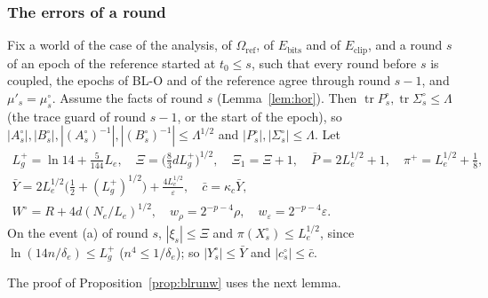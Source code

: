 \documentclass[11pt]{amsart}
\theoremstyle{definition}
\numberwithin{equation}{section}
\newcommand{\tr}{\operatorname{tr}}
\begin{document}
\subsubsection{The errors of a round}\label{app:track-errors}

Fix a world of the case of the analysis, of $\Omega_{\mathrm{ref}}$, of $E_{\mathrm{bits}}$ and of $E_{\mathrm{clip}}$, and a round $s$ of an epoch of the reference started at $t_0\le s$, such that every round before $s$ is coupled, the epochs of BL-O and of the reference agree through round $s-1$, and $\mu'_s=\mu^\circ_s$. Assume the facts of round $s$ (Lemma~\ref{lem:hor}). Then $\tr P^\circ_s,\tr\Sigma^\circ_s\le\Lambda$ (the trace guard of round $s-1$, or the start of the epoch), so $|A^\circ_s|,|B^\circ_s|,|(A^\circ_s)^{-1}|,|(B^\circ_s)^{-1}|\le\Lambda^{1/2}$ and $|P^\circ_s|,|\Sigma^\circ_s|\le\Lambda$. Let
\begin{gather*}
L_g^+=\ln14+\tfrac5{144}L_e,\quad\Xi=\bigl(\tfrac83dL_g^+\bigr)^{1/2},\quad\Xi_1=\Xi+1,\quad\bar P=2L_e^{1/2}+1,\quad\pi^+=L_e^{1/2}+\tfrac18,\\
\bar Y=2L_e^{1/2}\bigl(\tfrac12+(L_g^+)^{1/2}\bigr)+\frac{4L_e^{1/2}}\varepsilon,\quad\bar c=\kappa_c\bar Y,\\
W^\circ=R+4d(N_e/L_e)^{1/2},\quad w_\rho=2^{-p-4}\rho,\quad w_\varepsilon=2^{-p-4}\varepsilon .
\end{gather*}
On the event (a) of round $s$, $|\xi_s|\le\Xi$ and $\pi(X^\circ_s)\le L_e^{1/2}$, since $\ln(14n/\delta_e)\le L_g^+$ ($n^4\le1/\delta_e$); so $|Y^\circ_s|\le\bar Y$ and $|c^\circ_s|\le\bar c$.

The proof of Proposition~\ref{prop:blrunw} uses the next lemma.
\end{document}
